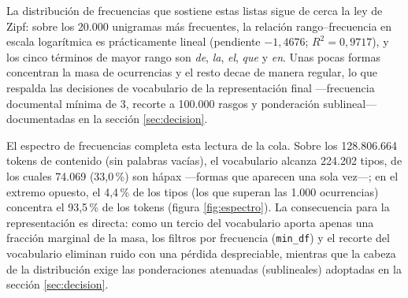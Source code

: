 \documentclass[11pt]{tg_usta}
\begin{document}
La distribución de frecuencias que sostiene estas listas sigue de cerca la ley de Zipf: sobre los 20.000 unigramas más frecuentes, la relación rango--frecuencia en escala logarítmica es prácticamente lineal (pendiente $-1{,}4676$; $R^2 = 0{,}9717$), y los cinco términos de mayor rango son \emph{de}, \emph{la}, \emph{el}, \emph{que} y \emph{en}. Unas pocas formas concentran la masa de ocurrencias y el resto decae de manera regular, lo que respalda las decisiones de vocabulario de la representación final ---frecuencia documental mínima de 3, recorte a 100.000 rasgos y ponderación sublineal--- documentadas en la sección \ref{sec:decision}.

El espectro de frecuencias completa esta lectura de la cola. Sobre los 128.806.664 tokens de contenido (sin palabras vacías), el vocabulario alcanza 224.202 tipos, de los cuales 74.069 (33,0\,\%) son hápax ---formas que aparecen una sola vez---; en el extremo opuesto, el 4,4\,\% de los tipos (los que superan las 1.000 ocurrencias) concentra el 93,5\,\% de los tokens (figura \ref{fig:espectro}). La consecuencia para la representación es directa: como un tercio del vocabulario aporta apenas una fracción marginal de la masa, los filtros por frecuencia (\texttt{min\_df}) y el recorte del vocabulario eliminan ruido con una pérdida despreciable, mientras que la cabeza de la distribución exige las ponderaciones atenuadas (sublineales) adoptadas en la sección \ref{sec:decision}.
\end{document}
